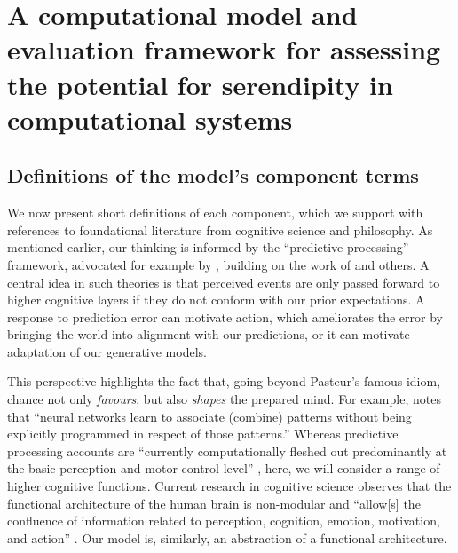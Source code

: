 \section{A computational model and evaluation framework for assessing the potential for serendipity in computational systems} \label{sec:our-model}

\subsection{Definitions of the model's component terms} \label{sec:modelTerms}

We now present short definitions of each component, which we support
with references to foundational literature from cognitive science and
philosophy.  As mentioned earlier, our thinking is informed by the
``predictive processing'' framework, advocated for example by
\citet{clark2013whatever}, building on the work of
\citet{friston2009free} and others.  A central idea in such theories
is that perceived events are only passed forward to higher cognitive
layers if they do not conform with our prior expectations.  A response
to prediction error can motivate action, which ameliorates the error
by bringing the world into alignment with our predictions, or it can
motivate adaptation of our generative models.

This perspective highlights the fact that, going beyond Pasteur's
famous idiom, chance not only \emph{favours}, but also \emph{shapes}
the prepared mind.  For example, \citet[p.~137]{boden} notes that
``neural networks learn to associate (combine) patterns without being
explicitly programmed in respect of those patterns.''  Whereas
predictive processing accounts are ``currently computationally fleshed
out predominantly at the basic perception and motor control level''
\cite{KWISTHOUT201784}, here, we will consider a range of higher
cognitive functions.  Current research in cognitive
science observes that the functional architecture of the
human brain is non-modular and ``allow[s] the confluence
of information related to perception, cognition, emotion, motivation,
and action'' \cite[p.~357]{Pessoa2017}.  Our model is, similarly, an
abstraction of a functional architecture.



